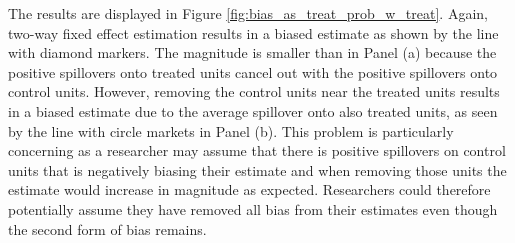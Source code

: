 \documentclass[11pt]{article}
\begin{document}
The results are displayed in Figure \ref{fig:bias_as_treat_prob_w_treat}. Again, two-way fixed effect estimation results in a biased estimate as shown by the line with diamond markers. The magnitude is smaller than in Panel (a) because the positive spillovers onto treated units cancel out with the positive spillovers onto control units. However, removing the control units near the treated units results in a biased estimate due to the average spillover onto also treated units, as seen by the line with circle markets in Panel (b). This problem is particularly concerning as a researcher may assume that there is positive spillovers on control units that is negatively biasing their estimate and when removing those units the estimate would increase in magnitude as expected. Researchers could therefore potentially assume they have removed all bias from their estimates even though the second form of bias remains. 





\end{document}
